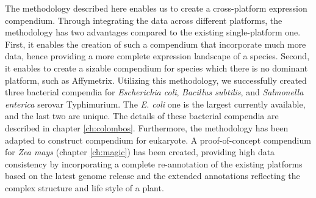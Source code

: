The methodology described here enables us to create a cross-platform expression compendium. Through integrating the data across different platforms, the methodology has two advantages compared to the existing single-platform one.  First, it enables the creation of such a compendium that incorporate much more data,  hence providing a more complete expression landscape of a species. Second, it enables to create a sizable compendium for species which there is no dominant platform, such as Affymetrix. Utilizing this methodology, we successfully created three bacterial compendia for {\it Escherichia coli}, {\it Bacillus subtilis}, and {\it   Salmonella enterica} serovar Typhimurium.  The \textit{E. coli} one is the largest currently available, and the last two are unique. The details of these bacterial compendia are described in chapter \ref{ch:colombos}. Furthermore, the methodology has been adapted to construct compendium for eukaryote. A proof-of-concept compendium for \textit{Zea mays} (chapter \ref{ch:magic}) has been created, providing high data consistency by incorporating a complete re-annotation of the existing platforms based on the latest genome release and the extended annotations reflecting the complex structure and life style of a plant.



\cleardoublepage


